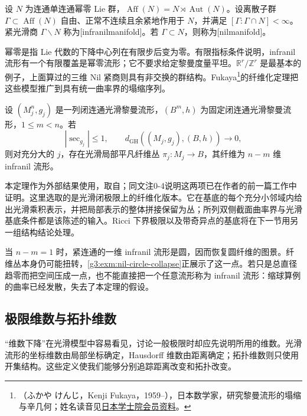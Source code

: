 \begin{definition}\label{g3:def:infranilmanifold}
	设 \(N\) 为连通单连通幂零 Lie 群，\(\operatorname{Aff}(N)=N\rtimes\operatorname{Aut}(N)\)。设离散子群 \(\Gamma\subset\operatorname{Aff}(N)\) 自由、正常不连续且余紧地作用于 \(N\)，并满足 \([\Gamma:\Gamma\cap N]<\infty\)。紧光滑商 \(\Gamma\backslash N\) 称为[infranilmanifold]。若 \(\Gamma\subset N\)，则称为[nilmanifold]。
\end{definition}

幂零是指 Lie 代数的下降中心列在有限步后变为零。有限指标条件说明，infranil 流形有一个有限覆盖是幂零流形；它不要求给定黎曼度量平坦。\(\mathbb R^r/\mathbb Z^r\) 是最基本的例子，上面算过的三维 Nil 紧商则具有非交换的群结构。Fukaya\footnote{（ふかや けんじ，Kenji Fukaya，1959--），日本数学家，研究黎曼流形的塌缩与辛几何；姓名读音见\href{https://www.japan-acad.go.jp/japanese/members/4/fukaya_kenji.html}{日本学士院会员资料}。}的纤维化定理把这些模型推广到具有统一曲率界的塌缩序列。

\begin{theorem}\label{g3:thm:fukaya-fibration-external}
	设 \((M_j^n,g_j)\) 是一列闭连通光滑黎曼流形，\((B^m,h)\) 为固定闭连通光滑黎曼流形，\(1\le m<n\)。若
	\[
		|\sec_{g_j}|\le1,\qquad
		d_{\mathrm{GH}}((M_j,g_j),(B,h))\longrightarrow0,
	\]
	则对充分大的 \(j\)，存在光滑局部平凡纤维丛 \(\pi_j:M_j\to B\)，其纤维为 \(n-m\) 维 infranil 流形。
\end{theorem}

本定理作为外部结果使用，取自\cite[定理0-1，第333页的(0-3-1)、(0-3-2)]{Fukaya1989CollapsingII}；同文注0-4说明这两项已在作者的前一篇工作中证明。这里选取的是光滑闭极限上的纤维化版本。它在基底的每个充分小邻域内给出光滑乘积表示，并把局部表示的整体拼接保留为丛；所列双侧截面曲率界与光滑基底条件都是该陈述的输入。Ricci 下界极限以及带奇异点的基底将在下一节用另一组结构结论处理。

\ProseParagraphBreak
当 \(n-m=1\) 时，紧连通的一维 infranil 流形是圆，因而恢复圆纤维的图景。纤维丛本身仍可能扭转，\cref{g3:exm:nil-circle-collapse}正展示了这一点。若只是总直径趋零而把空间压成一点，也不能直接把一个任意流形称为 infranil 流形：缩球算例的曲率已经发散，失去了本定理的假设。

\subsection{极限维数与拓扑维数}
\label{g3:subsec:2902:04}
“维数下降”在光滑模型中容易看见，讨论一般极限时却应先说明所用的维数。光滑流形的坐标维数由局部坐标确定，Hausdorff 维数由距离确定；拓扑维数则只使用开集结构。这些定义使我们能够分别追踪距离改变和拓扑改变。

